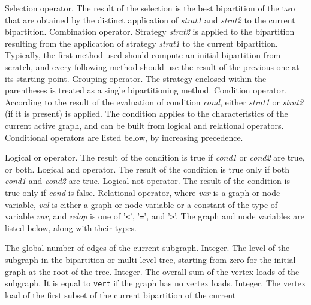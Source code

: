 \begin{itemize}
Selection operator. The result of the selection is the best bipartition of
the two that are obtained by the distinct application of {\it strat1\/} and
{\it strat2\/} to the current bipartition.
Combination operator. Strategy {\it strat2\/} is applied to the bipartition
resulting from the application of strategy {\it strat1\/} to the current
bipartition. Typically, the first method used should compute an initial
bipartition from scratch, and every following method should use the
result of the previous one at its starting point.
\iteme[{\tt (}{\it strat\/}{\tt )}]
Grouping operator.
The strategy enclosed within the parentheses is treated as a single
bipartitioning method.
Condition operator. According to the result of the evaluation of condition
{\it cond}, either {\it strat1\/} or {\it strat2\/} (if it is present) is
applied. The condition applies to the characteristics of the current active
graph, and can be built from logical and relational operators. Conditional
operators are listed below, by increasing precedence.
\begin{itemize}
Logical or operator. The result of the condition is true if {\it cond1\/}
or {\it cond2\/} are true, or both.
Logical and operator. The result of the condition is true only if both
{\it cond1\/} and {\it cond2\/} are true.
\iteme[{\tt !}{\it cond}]
Logical not operator. The result of the condition is true only if
{\it cond\/} is false.
Relational operator, where {\it var\/} is a graph or node variable,
{\it val\/} is either a graph or node variable or a constant of the type of
variable {\it var\/}, and {\it relop\/} is one of
'{\tt\verb+<+}', '{\tt\verb+=+}', and '{\tt\verb+>+}'.
The graph and node variables are listed below, along with their types.
\begin{itemize}
\iteme[{\tt edge}]
The global number of edges of the current subgraph.
Integer.
\iteme[{\tt levl}]
The level of the subgraph in the bipartition or multi-level tree, starting from zero
for the initial graph at the root of the tree.
Integer.
\iteme[{\tt load}]
The overall sum of the vertex loads of the subgraph. It is equal to
{\tt vert} if the graph has no vertex loads.
Integer.
\iteme[{\tt load0}]
The vertex load of the first subset of the current bipartition of the current

\end{itemize}
\end{itemize}
\end{itemize}
